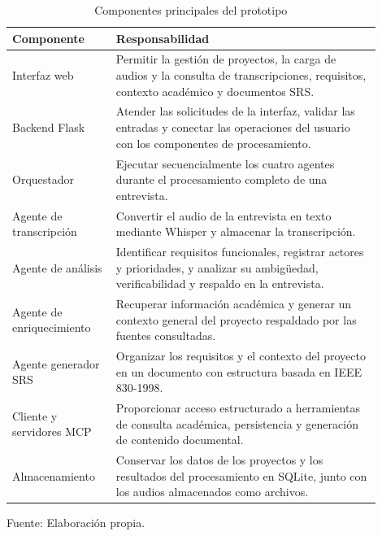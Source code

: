 \begin{table}[h]
    \centering
    \caption{Componentes principales del prototipo}
    \label{tab:componentes-sistema}
    \small
    \renewcommand{\arraystretch}{1.25}

    \begin{tabular}{|p{0.25\linewidth}|p{0.65\linewidth}|}
        \hline
        \textbf{Componente} & \textbf{Responsabilidad} \\
        \hline
        Interfaz web &
        Permitir la gestión de proyectos, la carga de audios
        y la consulta de transcripciones, requisitos,
        contexto académico y documentos SRS. \\
        \hline
        Backend Flask &
        Atender las solicitudes de la interfaz, validar las
        entradas y conectar las operaciones del usuario
        con los componentes de procesamiento. \\
        \hline
        Orquestador &
        Ejecutar secuencialmente los cuatro agentes
        durante el procesamiento completo de una entrevista. \\
        \hline
        Agente de transcripción &
        Convertir el audio de la entrevista en texto
        mediante Whisper y almacenar la transcripción. \\
        \hline
        Agente de análisis &
        Identificar requisitos funcionales, registrar
        actores y prioridades, y analizar su ambigüedad,
        verificabilidad y respaldo en la entrevista. \\
        \hline
        Agente de enriquecimiento &
        Recuperar información académica y generar un
        contexto general del proyecto respaldado
        por las fuentes consultadas. \\
        \hline
        Agente generador SRS &
        Organizar los requisitos y el contexto del proyecto
        en un documento con estructura basada en
        IEEE 830-1998. \\
        \hline
        Cliente y servidores MCP &
        Proporcionar acceso estructurado a herramientas
        de consulta académica, persistencia y generación
        de contenido documental. \\
        \hline
        Almacenamiento &
        Conservar los datos de los proyectos y los
        resultados del procesamiento en SQLite,
        junto con los audios almacenados como archivos. \\
        \hline
    \end{tabular}

    \par\vspace{0.2cm}
    \parbox{0.95\linewidth}{%
        \footnotesize Fuente: Elaboración propia.
    }
\end{table}

